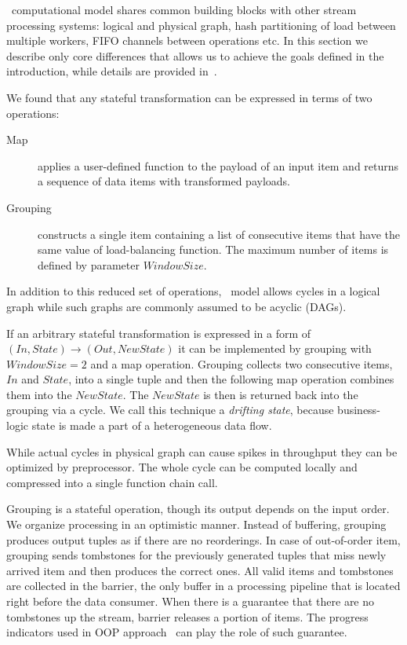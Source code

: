 \label {fs-short-model}

\FlameStream\ computational model shares common building blocks with other stream processing systems: logical and physical graph, hash partitioning of load between multiple workers, FIFO channels between operations etc. In this section we describe only core differences that allows us to achieve the goals defined in the introduction, while details are provided in~\cite{we2018seim}.

We found that any stateful transformation can be expressed in terms of two operations:

\begin {description}
  \item [Map] applies a user-defined function to the payload of an input item and returns a sequence of data items with transformed payloads. 
  \item [Grouping] constructs a single item containing a list of consecutive items that have the same value of load-balancing function. The maximum number of items is defined by parameter $Window Size$. 
\end {description}

In addition to this reduced set of operations, \FlameStream\ model allows cycles in a logical graph while such graphs are commonly assumed to be acyclic (DAGs).

If an arbitrary stateful transformation is expressed in a form of $(In, State) \rightarrow (Out, NewState)$ it can be implemented by grouping with $WindowSize = 2$ and a map operation. Grouping collects two consecutive items, $In$ and $State$, into a single tuple and then the following map operation combines them into the $NewState$. The $NewState$ is then is returned back into the grouping via a cycle. We call this technique a {\it drifting state}, because business-logic state is made a part of a heterogeneous data flow.

While actual cycles in physical graph can cause spikes in throughput they can be optimized by preprocessor. The whole cycle can be computed locally and compressed into a single function chain call.

Grouping is a stateful operation, though its output depends on the input order. We organize processing in an optimistic manner. Instead of buffering, grouping produces output tuples as if there are no reorderings. In case of out-of-order item, grouping sends tombstones for the previously generated tuples that miss newly arrived item and then produces the correct ones. All valid items and tombstones are collected in the barrier, the only buffer in a processing pipeline that is located right before the data consumer. When there is a guarantee that there are no tombstones up the stream, barrier releases a portion of items. The progress indicators used in OOP approach~\cite{Li:2008:OPN:1453856.1453890} can play the role of such guarantee.
